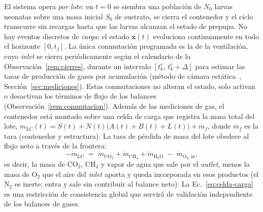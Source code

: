 \begin{remark}\label{rem:batch}
El sistema opera \emph{por lote}: en $t = 0$ se siembra una población de
$N_0$ larvas neonatas sobre una masa inicial $S_0$ de sustrato, se cierra el
contenedor y el ciclo transcurre sin recargas hasta que las larvas alcanzan
el estado de prepupa. No hay eventos discretos de \emph{carga}: el estado
$\mathbf{x}(t)$ evoluciona continuamente en todo el horizonte $[0, t_f]$.
La única conmutación programada es la de la ventilación, cuyo
\emph{inlet} se cierra periódicamente según el calendario de la
Observación~\ref{rem:cierres}, durante un intervalo $[t_k^{c},\, t_k^{c}+\Delta]$
para estimar las tasas de producción de gases por acumulación (método de
cámara estática~\citep{hutchinsonImprovedSoilCover1981,ermolaevGreenhouseGasEmissions2019}, Sección~\ref{sec:mediciones}). Estas conmutaciones no alteran el estado, solo
activan o desactivan los términos de flujo de los balances
(Observación~\ref{rem:conmutacion}). Además de las mediciones de gas, el contenedor
está montado sobre una celda de carga que registra la masa total del lote,
$m_{\mathrm{LC}}(t) = S(t) + N(t)\bigl(A(t) + B(t) + L(t)\bigr) + m_f$,
donde $m_f$ es la tara (contenedor y estructura). La tasa de pérdida de masa
del lote obedece al flujo neto a través de la frontera:
\begin{equation}
-\dot{m}_{\mathrm{LC}} \;=\;
\dot{m}_{\mathrm{CO_2}} + \dot{m}_{\mathrm{CH_4}} + \dot{m}_{\mathrm{H_2O}}
\;-\; \dot{m}_{\mathrm{O_2,in}},
\label{eq:celda-carga}
\end{equation}
es decir, la masa de CO$_2$, CH$_4$ y vapor de agua que sale por el
\emph{outlet}, menos la masa de O$_2$ que el aire del
\emph{inlet} aporta y queda incorporada en esos productos (el N$_2$ es inerte: entra y sale sin contribuir al balance neto). La
Ec.~\eqref{eq:celda-carga} es una restricción de consistencia global que
servirá de validación independiente de los balances de gases.
\end{remark}

